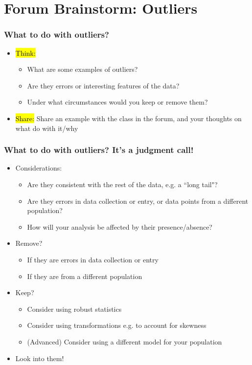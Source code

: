 \documentclass[slidestop,compress,mathserif]{beamer}
\begin{document}
\section{Forum Brainstorm: Outliers}

\begin{frame}
\frametitle{What to do with outliers?}
\begin{itemize}
\item \hl{Think:} 
\begin{itemize}
  \item What are some examples of outliers? 
  \item Are they errors or interesting features of the data?
  \item Under what circumstances would you keep or remove them?
\end{itemize}
\item \hl{Share:} Share an example with the class in the forum, and your thoughts on what do with it/why
\end{itemize}
\end{frame}

\begin{frame}
\frametitle{What to do with outliers? It's a judgment call!}
\begin{itemize}
  \item Considerations:
  \begin{itemize}
    \item Are they consistent with the rest of the data, e.g. a ``long tail"?
    \item Are they errors in data collection or entry, or data points from a different population?
    \item How will your analysis be affected by their presence/absence?
  \end{itemize}
  \item Remove?
  \begin{itemize}
    \item If they are errors in data collection or entry
    \item If they are from a different population
  \end{itemize}
  \item Keep?
  \begin{itemize}
    \item Consider using robust statistics
    \item Consider using transformations e.g. to account for skewness
    \item (Advanced) Consider using a different model for your population
  \end{itemize}
  \item Look into them!
\end{itemize}
\end{frame}
\end{document}
